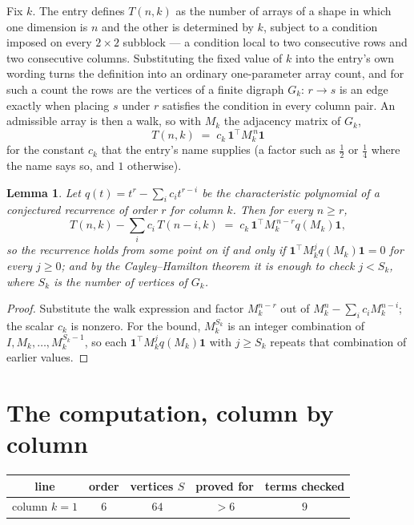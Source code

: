 \documentclass[11pt,a4paper]{article}
\theoremstyle{plain}
\newtheorem{lemma}[theorem]{Lemma}
\theoremstyle{definition}
\begin{document}
Fix $k$. The entry defines $T(n,k)$ as the number of arrays of a shape in which one dimension
is $n$ and the other is determined by $k$, subject to a condition imposed on every
$2\times2$ subblock --- a condition local to two consecutive rows and two consecutive columns.
Substituting the fixed value of $k$ into the entry's own wording turns the definition into an
ordinary one-parameter array count, and for such a count the rows are the vertices of a finite
digraph $G_k$: $r\to s$ is an edge exactly when placing $s$ under $r$ satisfies the condition
in every column pair. An admissible array is then a walk, so with $M_k$ the adjacency matrix
of $G_k$,
\[
T(n,k)\;=\;c_k\,\mathbf{1}^{\!\top}M_k^{\,n}\mathbf{1}
\]
for the constant $c_k$ that the entry's name supplies (a factor such as $\tfrac12$ or
$\tfrac14$ where the name says so, and $1$ otherwise).

\begin{lemma}\label{lem:crit}
Let $q(t)=t^{r}-\sum_i c_it^{r-i}$ be the characteristic polynomial of a conjectured
recurrence of order $r$ for column $k$. Then for every $n\ge r$,
\[
T(n,k)-\sum_i c_i\,T(n-i,k)\;=\;c_k\,\mathbf{1}^{\!\top}M_k^{\,n-r}q(M_k)\mathbf{1},
\]
so the recurrence holds from some point on if and only if
$\mathbf{1}^{\!\top}M_k^{j}q(M_k)\mathbf{1}=0$ for every $j\ge0$; and by the
Cayley--Hamilton theorem it is enough to check $j<S_k$, where $S_k$ is the number of vertices
of $G_k$.
\end{lemma}

\begin{proof}
Substitute the walk expression and factor $M_k^{n-r}$ out of $M_k^{n}-\sum_ic_iM_k^{n-i}$;
the scalar $c_k$ is nonzero. For the bound, $M_k^{S_k}$ is an integer combination of
$I,M_k,\dots,M_k^{S_k-1}$, so each $\mathbf{1}^{\!\top}M_k^{j}q(M_k)\mathbf{1}$ with
$j\ge S_k$ repeats that combination of earlier values.
\end{proof}

\section{The computation, column by column}

\begin{center}
\begin{tabular}{ccccc}
line & order & vertices $S$ & proved for & terms checked \\ \hline
column $k$$=1$ & $6$ & $64$ & $>6$ & $9$ \\
\end{tabular}
\end{center}
\end{document}
